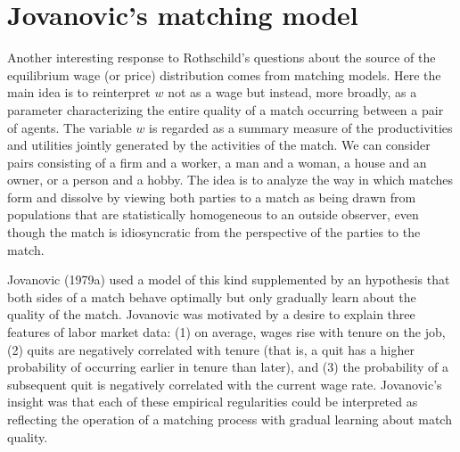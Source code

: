 

\section{Jovanovic's matching model}\label{sec:Jov}%
Another  interesting response to  Rothschild's questions about the source of the equilibrium wage (or price) distribution
comes  from matching models. Here  the main idea is to
reinterpret $w$ not as a wage but instead, more broadly, as a parameter
characterizing the entire quality of a match occurring between a pair of
agents.  The variable $w$ is regarded as a summary measure of the
productivities and utilities jointly generated by the activities of the match.
We can consider pairs consisting of  a firm and a worker, a man and a woman, a
house and an owner, or a person and a hobby.  The idea is to analyze the way in
which matches form and  dissolve by viewing both parties to a match
as being drawn from populations that are statistically homogeneous to an
outside observer, even though the match is idiosyncratic from the perspective
of the parties to the match.

Jovanovic (1979a)  used a model of this kind supplemented by an hypothesis that both
sides of a match behave optimally but only gradually learn about the quality
of the match.  Jovanovic was motivated by a desire to explain three features of
labor market data: (1) on average, wages rise with tenure on the job, (2) quits
are negatively correlated with tenure (that is, a quit has a higher probability
of occurring earlier in tenure than later), and (3) the probability of a
subsequent quit is negatively correlated with the current wage rate.
Jovanovic's insight was that each of these empirical regularities could be
interpreted as reflecting the operation of a matching process with gradual
learning about match quality.

